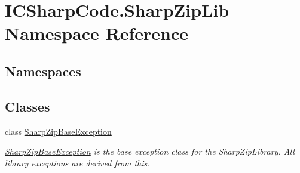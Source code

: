 \hypertarget{namespace_i_c_sharp_code_1_1_sharp_zip_lib}{}\section{I\+C\+Sharp\+Code.\+Sharp\+Zip\+Lib Namespace Reference}
\label{namespace_i_c_sharp_code_1_1_sharp_zip_lib}
\subsection*{Namespaces}
\begin{DoxyCompactItemize}
\end{DoxyCompactItemize}
\subsection*{Classes}
\begin{DoxyCompactItemize}
\item 
class \hyperlink{class_i_c_sharp_code_1_1_sharp_zip_lib_1_1_sharp_zip_base_exception}{Sharp\+Zip\+Base\+Exception}
\begin{DoxyCompactList}\small\item\em \hyperlink{class_i_c_sharp_code_1_1_sharp_zip_lib_1_1_sharp_zip_base_exception}{Sharp\+Zip\+Base\+Exception} is the base exception class for the Sharp\+Zip\+Library. All library exceptions are derived from this. \end{DoxyCompactList}\end{DoxyCompactItemize}
